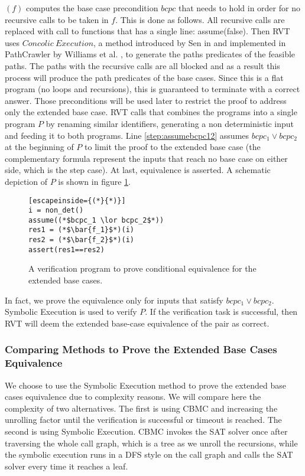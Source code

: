 $(f)$ computes the base case precondition $bcpc$ that needs to hold in order for no recursive calls to be taken in $f$. This is done as follows. All recursive calls are replaced with call to  functions that has a single line: assume(false). Then RVT uses $Concolic\ Execution$, a method introduced by Sen in \cite{10.1145/1321631.1321746} and implemented in PathCrawler  by Williams et al. \cite{10.1007/11408901_21}, to generate the paths predicates of the feasible paths. The paths with the recursive calls are all blocked and as a result this process will produce the path predicates of the base cases. Since this is a flat program (no loops and recursions), this is guaranteed to terminate with a correct answer. Those preconditions will be used later to restrict the proof to address only the extended base case. RVT calls  that combines the programs into a single program $P$ by renaming similar identifiers, generating a non deterministic input and feeding it to both programs. Line \ref{step:assumebcpc12} assumes $bcpc_1 \lor bcpc_2$ at the beginning of $P$ to limit the proof to the extended base case (the complementary formula represent the inputs that reach no base case on either side, which is the step case). At last, equivalence is asserted. A schematic depiction of $P$ is shown in figure \ref{fig:basegapvefprogram}. 
\begin{figure} [h]
\begin{center}
\begin{minipage}{7 cm}
\begin{lstlisting}[escapeinside={(*}{*)}]
i = non_det()
assume((*$bcpc_1 \lor bcpc_2$*))
res1 = (*$\bar{f_1}$*)(i)
res2 = (*$\bar{f_2}$*)(i)
assert(res1==res2)
\end{lstlisting}
\end{minipage}
\caption{A verification program to prove conditional equivalence for the extended base cases.}
\label{fig:basegapvefprogram}
\end{center}
\end{figure}
In fact, we prove the equivalence only for  inputs that satisfy $bcpc_1 \lor bcpc_2$. Symbolic Execution is used to verify $P$. If the verification task is successful, then RVT will deem the extended base-case equivalence of the pair as correct. 

\subsubsection{Comparing Methods to Prove the Extended Base Cases Equivalence}
We choose to use the Symbolic Execution method to prove the extended base cases equivalence due to complexity reasons. We will compare here the complexity of two alternatives. The first is using CBMC and increasing the unrolling factor until the verification is successful or timeout is reached. The second is using Symbolic Execution. 
CBMC invokes the SAT solver once after traversing the whole call graph, which is a tree as we unroll the recursions, while the symbolic execution runs in a DFS style on the call graph and calls the SAT solver every time it reaches a leaf.


